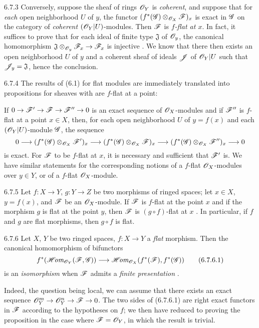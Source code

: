 \begin{env}{6.7.3}
\label{env-0.6.7.3}
Conversely, suppose the sheaf of rings $\mathscr{O}_Y$ is \emph{coherent}, and suppose that for
\emph{each} open neighborhood $U$ of $y$, the functor $(f^*(\mathscr{G})\otimes_{\mathscr{O}_X}\mathscr{F})_x$
is exact in $\mathscr{G}$ on the category of \emph{coherent} $(\mathscr{O}_Y|U)$-modules. Then $\mathscr{F}$ is
\emph{$f$-flat at $x$}. In fact, it suffices to prove that for each ideal of finite type
$\mathfrak{J}$ of $\mathscr{O}_y$, the canonical homomorphism
$\mathfrak{J}\otimes_{\mathscr{O}_y}\mathscr{F}_x\to\mathscr{F}_x$ is injective . We know
 that there then exists an open neighborhood
$U$ of $y$ and a coherent sheaf of ideals $\mathscr{J}$ of $\mathscr{O}_Y|U$ such that
$\mathscr{J}_y=\mathfrak{J}$, hence the conclusion.
\end{env}

\begin{env}{6.7.4}
\label{env-0.6.7.4}
The results of (6.1) for flat modules are immediately translated into propositions for
sheaves with are $f$-flat at a point:

If $0\to\mathscr{F}'\to\mathscr{F}\to\mathscr{F}''\to 0$ is an exact sequence of $\mathscr{O}_X$-modules and if
$\mathscr{F}''$ is $f$-flat at a point $x\in X$, then, for each open neighborhood $U$ of $y=f(x)$
and each $(\mathscr{O}_Y|U)$-module $\mathscr{G}$, the sequence
\[
  0\longrightarrow(f^*(\mathscr{G})\otimes_{\mathscr{O}_X}\mathscr{F}')_x
  \longrightarrow(f^*(\mathscr{G})\otimes_{\mathscr{O}_X}\mathscr{F})_x
  \longrightarrow(f^*(\mathscr{G})\otimes_{\mathscr{O}_X}\mathscr{F}'')_x\longrightarrow 0
\]
is exact. For $\mathscr{F}$ to be $f$-flat at $x$, it is necessary and sufficient that $\mathscr{F}'$
is. We have similar statements for the corresponding notions of a $f$-flat $\mathscr{O}_X$-modules
over $y\in Y$, or of a $f$-flat $\mathscr{O}_X$-module.
\end{env}

\begin{env}{6.7.5}
\label{env-0.6.7.5}
Let $f:X\to Y$, $g:Y\to Z$ be two morphisms of ringed spaces; let $x\in X$, $y=f(x)$, and
$\mathscr{F}$ be an $\mathscr{O}_X$-module. If $\mathscr{F}$ is $f$-flat at the point $x$ and if the morphism
$g$ is flat at the point $y$, then $\mathscr{F}$ is $(g\circ f)$-flat at $x$ . In
particular, if $f$ and $g$ are flat morphisms, then $g\circ f$ is flat.
\end{env}

\begin{env}{6.7.6}
\label{env-0.6.7.6}
Let $X$, $Y$ be two ringed spaces, $f:X\to Y$ a \emph{flat} morphism. Then the canonical
homomorphism of bifunctors 
\[
  f^*(\mathscr{H}\!\textit{om}_{\mathscr{O}_Y}(\mathscr{F},\mathscr{G}))\longrightarrow\mathscr{H}\!\textit{om}_{\mathscr{O}_X}(f^*(\mathscr{F}),f^*(\mathscr{G}))
  \tag{6.7.6.1}
\]
is an \emph{isomorphism} when $\mathscr{F}$ admits a \emph{finite presentation} .

Indeed, the question being local, we can assume that there exists an exact sequence
$\mathscr{O}_Y^m\to\mathscr{O}_Y^n\to\mathscr{F}\to 0$. The two sides of (6.7.6.1) are right exact functors in
$\mathscr{F}$ according to the hypotheses on $f$; we then have reduced to proving the proposition
in the case where $\mathscr{F}=\mathscr{O}_Y$, in which the result is trivial.
\end{env}

